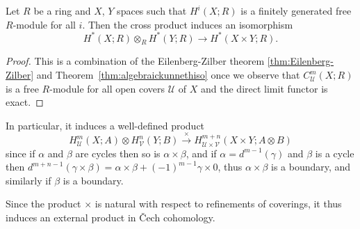 \documentclass[a4paper,openany]{scrbook}
\begin{document}
\begin{corollary}\label{cor:kunneth}
Let $R$ be a ring and $X$, $Y$ spaces such that $H^i(X;R)$ is a finitely generated free $R$-module for all $i$. Then the cross product induces an isomorphism
\[
H^*(X;R) \otimes_R H^*(Y;R) \to H^*(X \times Y;R).
\]
\end{corollary}
\begin{proof}
This is a combination of the Eilenberg-Zilber theorem \eqref{thm:Eilenberg-Zilber} and Theorem~\ref{thm:algebraickunnethiso} once we observe that $C^m_{\mathcal U}(X;R)$ is a free $R$-module for all open covers $\mathcal U$ of $X$ and the direct limit functor is exact.
\end{proof}

In particular, it induces a well-defined product
\[
H^m_{\mathcal U}(X;A) \otimes H^n_{\mathcal V}(Y;B) \xrightarrow{\times} H^{m+n}_{\mathcal U \times \mathcal V}(X\times Y;A \otimes B)
\]
since if $\alpha$ and $\beta$ are cycles then so is $\alpha \times \beta$, and if $\alpha=d^{m-1}(\gamma)$ and $\beta$ is a cycle then $d^{m+n-1}(\gamma \times \beta) = \alpha \times \beta + (-1)^{m-1}\gamma \times 0$, thus $\alpha \times \beta$ is a boundary, and similarly if $\beta$ is a boundary.

Since the product $\times$ is natural with respect to refinements of coverings, it thus induces an external product in \v Cech cohomology.
\end{document}
